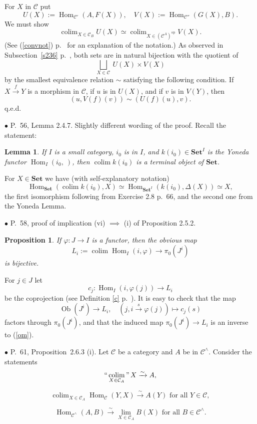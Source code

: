 \documentclass[12pt]{article}
\newtheorem{lem}[thm]{Lemma}
\newtheorem{prop}[thm]{Proposition}
\theoremstyle{remark}%
\newcommand{\bu}{\bullet}
\newcommand{\n}{\noindent}
\newcommand{\C}{\mathcal C}
\newcommand{\Set}{\textbf{Set}}
\newcommand{\p}{\varphi}
\newcommand{\pf}{\n{\em Proof. }}
\newcommand{\xr}{\xrightarrow}
\newcommand{\be}{\begin{equation}}
\newcommand{\ee}{\end{equation}}
\newcommand{\bl}{\begin{lem}}
\newcommand{\el}{\end{lem}}
\newcommand{\bp}{\begin{prop}}
\newcommand{\ep}{\end{prop}}
\newcommand{\pr}{Proposition}
\newcommand{\cn}{(See (\ref{convnot}) p.~\pageref{convnot} for an explanation of the notation.) }
\DeclareMathOperator*{\coli}{colim}
\DeclareMathOperator*{\co}{colim}
\DeclareMathOperator*{\ic}{``\coli"}
\DeclareMathOperator{\Hom}{Hom}
\DeclareMathOperator{\h}{Hom}
\DeclareMathOperator{\Ob}{Ob}
\DeclareMathOperator{\op}{op}
\begin{document}
\n{\em Second proof.} For $X$ in $\C$ put 
% 
\be\label{p2}
U(X):=\h_{\C'}(A,F(X)),\quad V(X):=\h_{\C''}(G(X),B). 
\ee
% 
We must show 
$$
\co_{X\in\C_B}U(X)\simeq\co_{X\in(\C^A)^{\op}}V(X). 
$$ 
\cn As observed in Subsection~\ref{s236} p.~\pageref{s236}, both sets are in natural bijection with the quotient of 
$$
\bigsqcup_{X\in\C}\ U(X)\times V(X) 
$$ 
by the smallest equivalence relation $\sim$ satisfying the following condition. If $X\xr fY$ is a morphism in $\C$, if $u$ is in $U(X)$, and if $v$ is in $V(Y)$, then 
$$
(u,V(f)(v))\sim(U(f)(u),v). 
$$ 
q.e.d. 


\n$\bu$ P.~56, Lemma 2.4.7. Slightly different wording of the proof. Recall the statement: 
%
\bl 
If $I$ is a small category, $i_0$ is in $I$, and $k(i_0)\in\Set^I$ is the Yoneda functor $\Hom_I(i_0,\ )$, then $\coli k(i_0)$ is a terminal object of $\Set$. 
\el
% 
\pf For $X\in\Set$ we have (with self-explanatory notation)
$$
\Hom_{\Set}\left(\coli k(i_0),X\right)\simeq\Hom_{{\Set}^I}(k(i_0),\Delta(X))\simeq X,
$$
the first isomorphism following from Exercise 2.8 p.~66, and the second one from the Yoneda Lemma. 


\n$\bu$ P.~58, proof of implication (vi) $\implies$ (i) of Proposition 2.5.2. 
%
\bp 
If $\p:J\to I$ is a functor, then the obvious map  
\begin{equation}\label{om}
L_i:=\coli\Hom_I(i,\p)\to\pi_0(J^i)
\end{equation}
is bijective. 
\ep
%  
\pf For $j\in J$ let 
$$
c_j:\Hom_I(i,\p(j))\to L_i
$$
be the coprojection (see Definition \ref{c} p.~\pageref{c}). It is easy to check that the map 
$$
\Ob(J^i)\to L_i,\quad (j,i\overset{s}{\to}\p(j))\mapsto c_j(s)
$$
factors through $\pi_0(J^i)$, and that the induced map $\pi_0(J^i)\to L_i$ is an inverse to (\ref{om}). 


\n$\bu$ P.~61, \pr\ 2.6.3 (i). Let $\C$ be a category and $A$ be in $\C^\wedge$. Consider the statements  
% 
\begin{equation}\label{263a}
\ic_{X\in\C_A}X\xrightarrow\sim A, 
\end{equation} 

\begin{equation}\label{263b}
\co_{X\in\C_A}\h_\C(Y,X)\xrightarrow\sim A(Y)\text{ for all }Y\in\C, 
\end{equation}

\begin{equation}\label{263} 
\h_{\C^\wedge}(A,B)\xrightarrow\sim\lim_{X\in\C_A}B(X)\text{ for all }B\in\C^\wedge. 
\end{equation} 
\end{document}
